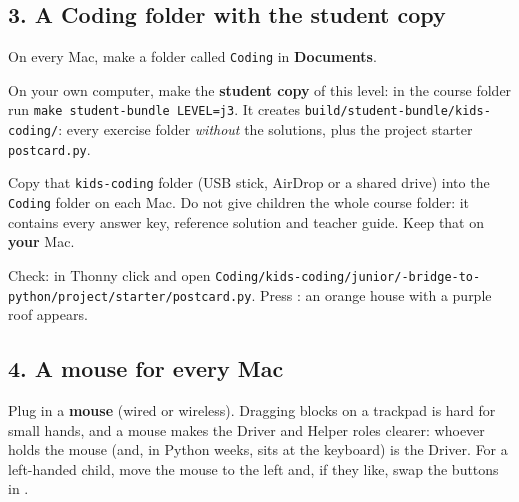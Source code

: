 \documentclass[track=junior,level=3,teacher]{kidscode}
\begin{document}
\subsection{3. A Coding folder with the student copy}
\begin{checklist}
  \item On every Mac, make a folder called \texttt{Coding} in \textbf{Documents}.
  \item On your own computer, make the \textbf{student copy} of this level: in the course folder run
        \texttt{make student-bundle LEVEL=j3}. It creates
        \texttt{build/\allowbreak student-bundle/\allowbreak kids-coding/}: every exercise folder
        \emph{without} the solutions, plus the project starter \texttt{postcard.py}.
  \item Copy that \texttt{kids-coding} folder (USB stick, AirDrop or a shared drive) into the
        \texttt{Coding} folder on each Mac. Do not give children the whole course folder: it contains
        every answer key, reference solution and teacher guide. Keep that on \textbf{your} Mac.
  \item Check: in Thonny click  and open
        \texttt{Coding/\allowbreak kids-coding/\allowbreak junior/-bridge-to-python/\allowbreak project/\allowbreak starter/\allowbreak postcard.py}.
        Press : an orange house with a purple roof appears.
\end{checklist}

\subsection{4. A mouse for every Mac}
Plug in a \textbf{mouse} (wired or wireless). Dragging blocks on a trackpad is hard for small hands,
and a mouse makes the Driver and Helper roles clearer: whoever holds the mouse (and, in Python weeks,
sits at the keyboard) is the Driver. For a left-handed child, move the mouse to the left and, if they
like, swap the buttons in .
\end{document}
